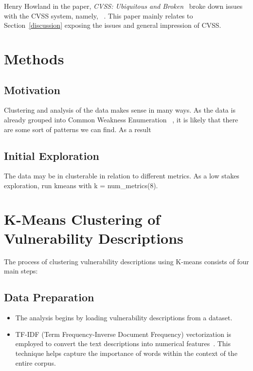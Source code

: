 \documentclass[12pt]{article}
\begin{document}
Henry Howland in the paper, \textit{CVSS: Ubiquitous and Broken}~\cite{ubiquitous} broke down issues with
the CVSS system, namely, ~\cite{ubiquitous}.  This paper mainly relates to Section~\ref{discussion} exposing the
issues and general impression of CVSS.

\section{Methods}
\subsection{Motivation}
Clustering and analysis of the data makes sense in many ways. As the data is already grouped into
Common Weakness Enumeration~\cite{CWE} , it is likely that there are some sort of patterns we can find. As a result

\subsection*{Initial Exploration}

The data may be in clusterable in relation to different metrics. As a low stakes exploration, run
kmeans\cite{kmeans} with k = num\_metrics(8).


\section{K-Means Clustering of Vulnerability Descriptions}

The process of clustering vulnerability descriptions using K-means consists of four main steps:

\subsection{Data Preparation}

\begin{itemize}

	\item The analysis begins by loading vulnerability descriptions from a dataset.

	\item TF-IDF (Term Frequency-Inverse Document Frequency) vectorization is employed to convert
	      the text descriptions into numerical features~\cite{tfidf}. This technique helps capture the importance
	      of words within the context of the entire corpus.

\end{itemize}
\end{document}
